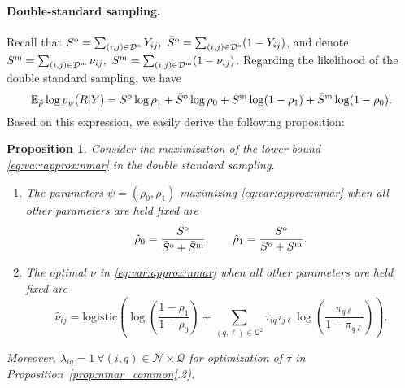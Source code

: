 \documentclass[10pt]{article}
\newcommand{\1}{\mathds{1}}
\newcommand{\MA}{Y}
\newcommand{\block}{\mathcal{Q}}
\newcommand{\dyad}{\mathcal{D}}
\newcommand{\dyadO}{\dyad^\text{\rm o}}
\newcommand{\dyadM}{\dyad^\text{\rm m}}
\newcommand{\node}{\mathcal{N}}
\newtheorem{proposition}{Proposition}
\begin{document}
\paragraph*{\bf     Double-standard     sampling.}     Recall     that
$S^\text{\rm o}  = \sum_{(i,j)\in \dyadO} Y_{ij},  \ \bar{S}^\text{\rm
  o}        =        \sum_{(i,j)\in        \dyadO}        (1-Y_{ij})$,
and                                                             denote
$S^\text{\rm m} = \sum_{(i,j)\in \dyadM} \nu_{ij}, \ \bar{S}^\text{\rm
  m}        =       \sum_{(i,j)\in        \dyadM}       (1-\nu_{ij})$.
Regarding  the   likelihood  of   the  double
standard sampling, we have
\begin{equation}\nonumber
  \mathbb{E}_{\tilde p} \log p_{\psi}(R|\MA) =
  S^\text{\rm o} \log \rho_1 + \bar{S}^\text{\rm o}
  \log \rho_0 + S^\text{\rm m}  \log (1-\rho_1) + \bar{S}^\text{\rm m}
  \log (1-\rho_0).
\end{equation}
Based on this expression, we easily derive the following proposition: 
\begin{proposition}\label{prop:nmar_doublestand}
  Consider     the     maximization     of     the     lower     bound
  \eqref{eq:var:approx:nmar} in the double standard sampling.
  \begin{enumerate}
  \item   The   parameters   $\psi   =   (\rho_0,\rho_1)$   maximizing
    \eqref{eq:var:approx:nmar}  when  all  other parameters  are  held
    fixed are
    \begin{equation}
      \label{eq:rho_01}
      \hat{\rho}_0  = \frac{\bar{S}^\text{\rm  o}}{\bar{S}^\text{\rm o}  +
        \bar{S}^\text{\rm m}}, \qquad
      \hat{\rho}_1 = \frac{S^\text{\rm o}}{S^\text{\rm o} + S^\text{\rm m}}.
    \end{equation}
    
  \item The optimal $\nu$ in \eqref{eq:var:approx:nmar} when all
    other parameters are held fixed are
    \begin{equation}\nonumber
      \hat{\nu}_{ij} = \mathrm{logistic} \left( \log \left( \frac{1-\rho_1}{1-\rho_0} \right) + \sum_{(q,\ell)\in\block^2} \tau_{iq}\tau_{j\ell} \log\left(\frac{\pi_{q\ell}}{1-\pi_{q\ell}}\right) \right).
    \end{equation}
  \end{enumerate}
  Moreover, $\lambda_{iq}  = 1 \ \forall  (i,q) \in \node\times\block$
  for optimization of $\tau$ in Proposition~\ref{prop:nmar_common}.2).
\end{proposition}
\end{document}
